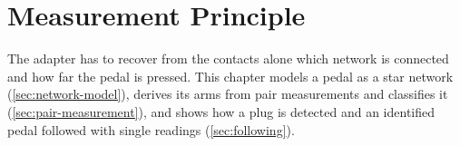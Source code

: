 
\chapter{Measurement Principle}
\label{ch:measurement-principle}

The adapter has to recover from the contacts alone which network is connected and how far the pedal is pressed. This chapter models a pedal as a star network (\cref{sec:network-model}), derives its arms from pair measurements and classifies it (\cref{sec:pair-measurement}), and shows how a plug is detected and an identified pedal followed with single readings (\cref{sec:following}).




